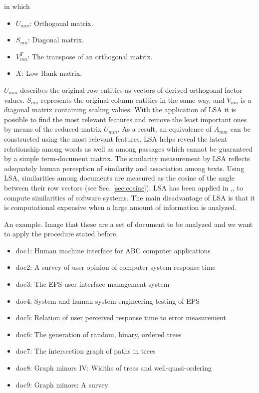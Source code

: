 in which

\begin{itemize}
	\item $U_{mm}$: Orthogonal matrix.
	\item $S_{mn}$: Diagonal matrix.
	\item $V_{mn}^{T}$: The transpose of an orthogonal matrix.
	\item $X$: Low Rank matrix.
\end{itemize}


$U_{mm}$ describes the original row entities as vectors of derived orthogonal factor values. $S_{mn}$ represents the original column entities in the same way, and $V_{mn}$ is a diagonal matrix containing scaling values. With the application of LSA it is possible to find the most relevant features and remove the least important ones by means of the reduced matrix $U_{mm}$. As a result, an equivalence of $A_{mm}$ can be constructed using the most relevant features. LSA helps reveal the latent relationship among words as well as among passages which cannot be guaranteed by a simple term-document matrix. The similarity measurement by LSA reflects adequately human perception of similarity and association among texts. Using LSA, similarities among documents are measured as the cosine of the angle between their row vectors (see Sec. \ref{sec:cosine}). LSA has been applied in \cite{10.1109/APSEC.2004.69},\cite{10.1109ICPC.2016.7503721},\cite{McMillan:2012:DSS:2337223.2337267} to compute similarities of software systems. The main disadvantage of LSA is that it is computational expensive when a large amount of information is analyzed.

\newpage

An example.
Image that these are a set of document to be analyzed and we want to apply the procedure stated before.
\begin{itemize}
	\item doc1: Human machine interface for ABC computer applications
	\item doc2: A survey of user opinion of computer system response time
	\item doc3: The EPS user interface management system
	\item doc4: System and human system engineering testing of EPS
	\item doc5: Relation of user perceived response time to error measurement
	\item doc6: The generation of random, binary, ordered trees
	\item doc7: The intersection graph of paths in trees
	\item doc8: Graph minors IV: Widths of trees and well-quasi-ordering
	\item doc9: Graph minors: A survey
\end{itemize}

